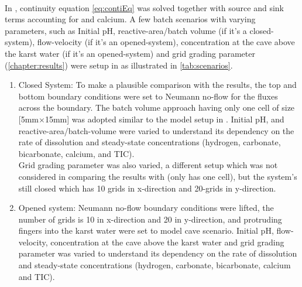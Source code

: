 \paragraph*{\DuMuX} In \DuMuX, continuity equation \ref{eq:contiEq} was solved together with source and sink terms accounting for 
 and calcium. A few batch scenarios with varying parameters, such as Initial pH, reactive-area/batch volume (if it's a closed-system), 
flow-velocity (if it's an opened-system),  concentration at the cave above the karst water (if it's an opened-system) and grid grading 
parameter (\ref{chapter:results}) were setup in \DuMuX as illustrated in \cref{tab:scenarios}. 
\begin{enumerate}
    \item Closed System: To make a plausible comparison with the \MATLAB results, the top and bottom boundary 
    conditions were set to Neumann no-flow for the fluxes across the boundary. The batch volume approach having only 
    one cell of size [5mm$\times$15mm] was adopted similar to the model setup in \MATLAB. Initial pH, and reactive-area/batch-volume 
    were varied to understand its dependency on the rate of dissolution and steady-state concentrations (hydrogen, carbonate, bicarbonate, calcium, and TIC).\\
    Grid grading parameter was also varied, a different setup which was not considered in comparing the results with 
    \MATLAB (\MATLAB only has one cell), but the system's still closed which has 10 grids in x-direction and 20-grids in y-direction. 
    \item Opened system: Neumann no-flow boundary conditions were lifted, the number of grids is 10 in x-direction and 20 in y-direction, 
    and  protruding  fingers into the karst water were set to model cave scenario. Initial pH, flow-velocity,  
    concentration at the cave above the karst water and grid grading parameter was varied to understand its dependency on the 
    rate of dissolution and steady-state concentrations (hydrogen, carbonate, bicarbonate, calcium and TIC).
\end{enumerate}


